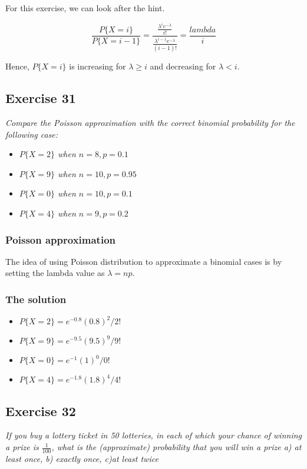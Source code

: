 \documentclass[12pt,a4paper]{article}
\begin{document}
For this exercise, we can look after the hint.

\[
\frac{P\{X = i\}}{P\{X = i-1\}} = \frac{\frac{\lambda^{i} e^{-\lambda}}{i!}}{\frac{\lambda^{i-1} e^{-\lambda}}{(i-1)!}} = \frac{lambda}{i}
\]

Hence, $P\{X=i\}$ is increasing for $\lambda \geq i$ and decreasing for $\lambda < i$.


\subsection{Exercise 31}

\textit{Compare the Poisson approximation with the correct binomial probability for the following case:}

\begin{itemize}
	\item \textit{$P\{X=2\}$ when $n=8, p=0.1$}
	\item \textit{$P\{X=9\}$ when $n=10, p=0.95$}
	\item \textit{$P\{X=0\}$ when $n=10, p=0.1$}
	\item \textit{$P\{X=4\}$ when $n=9, p=0.2$}
\end{itemize}

\subsubsection{Poisson approximation}

The idea of using Poisson distribution to approximate a binomial cases is by setting the lambda value as $\lambda = np$.

\subsubsection{The solution}

\begin{itemize}
	\item $P\{X=2\} = e^{-0.8}(0.8)^{2}/2!$ 
	\item $P\{X=9\} = e^{-9.5}(9.5)^{9}/9!$
	\item $P\{X=0\} = e^{-1}(1)^{0}/0!$
	\item $P\{X=4\} = e^{-1.8}(1.8)^{4}/4!$
\end{itemize}

\subsection{Exercise 32}

\textit{If you buy a lottery ticket in 50 lotteries, in each of which your chance of winning a prize is $\frac{1}{100}$, what is the (approximate) probability that you will win a prize a) at least once, b) exactly once, c)at least twice}
\end{document}
